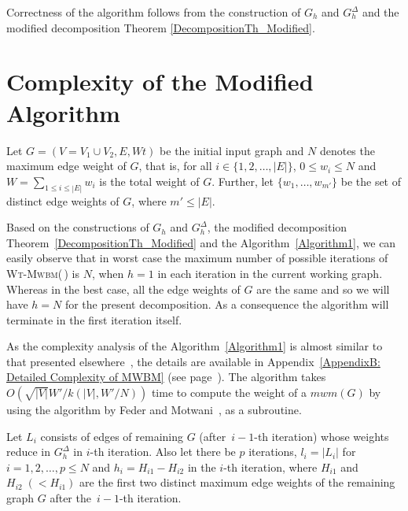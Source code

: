 \documentclass[runningheads,a4paper]{llncs}
\begin{document}
Correctness of the algorithm follows from the construction of $G_h$ and
${G_h^\Delta}$ and the modified decomposition Theorem
\ref{DecompositionTh_Modified}.



\section{Complexity of the Modified Algorithm}
\label{mwbm:Complexity_analysis}
Let $G = (V = V_1 \cup V_2 , E, \textit{Wt})$ be the initial input graph and $N$ denotes the maximum edge weight of $G$, that is, for all $i \in \{1,2,\ldots, |E|\}$, $0
\leq w_i \leq N$ and $W=\sum_{1 \leq i \leq |E|} w_i $ is the total weight of $G$. Further, let $\{w_1, \ldots, w_{m'}\}$ be the set
of distinct edge weights of $G$, where $m' \leq |E|$.

Based on the constructions of $G_h$ and $G_h^\Delta$,  the modified
decomposition Theorem~\ref{DecompositionTh_Modified} and the
Algorithm~\ref{Algorithm1},
we can easily observe that in worst case the maximum number of possible iterations of \textsc{Wt-Mwbm}(\,)
is $N$, when $h=1$ in each iteration in the current working graph. Whereas in the best case,
all the edge weights of $G$ are the same and so we will have $h=N$ for the present decomposition. As a consequence the algorithm will terminate in the
first iteration itself.

As the complexity analysis of the Algorithm~\ref{Algorithm1} is almost
similar to that presented elsewhere~\cite{kao02}, the details are available in Appendix~\ref{AppendixB: Detailed Complexity of MWBM} (see page~\pageref{AppendixB: Detailed Complexity of MWBM}).
The algorithm takes
$O(\sqrt{|V|}W'/k(|V|,W'/{N}))$ time to compute the weight of a
$\textit{mwm}(G)$ by using the algorithm by Feder and Motwani~\cite{feder95}, as a subroutine.

Let $L_i$ consists of edges of remaining $G$ (after \,$i-1$-th iteration) whose weights reduce in $G_h^\Delta$ in $i$-th iteration. 
Also let there be $p$ iterations, $l_i=|L_i|$ for
$i=1,2,\ldots,p  \leq N$ and $h_i=H_{i1}-H_{i2}$ in the $i$-th iteration, where $H_{i1}$ and $H_{i2} \;(<H_{i1})$ are the first two distinct maximum edge weights of the remaining graph $G$ after the \,$i -1$-th iteration.
\end{document}
